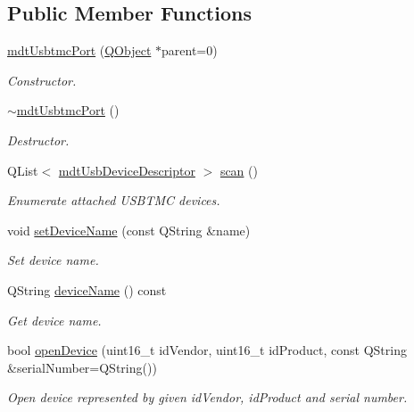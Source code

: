 \subsection*{Public Member Functions}
\begin{DoxyCompactItemize}
\item 
\hyperlink{classmdt_usbtmc_port_a102a2d5ebad4968621812e682d9d1b71}{mdt\-Usbtmc\-Port} (\hyperlink{class_q_object}{Q\-Object} $\ast$parent=0)
\begin{DoxyCompactList}\small\item\em Constructor. \end{DoxyCompactList}\item 
\hyperlink{classmdt_usbtmc_port_a3f9d3f1f40f61e17fa2997f3ad181d30}{$\sim$mdt\-Usbtmc\-Port} ()
\begin{DoxyCompactList}\small\item\em Destructor. \end{DoxyCompactList}\item 
Q\-List$<$ \hyperlink{classmdt_usb_device_descriptor}{mdt\-Usb\-Device\-Descriptor} $>$ \hyperlink{classmdt_usbtmc_port_a8f555cd150a82b74322e2f109bb094f4}{scan} ()
\begin{DoxyCompactList}\small\item\em Enumerate attached U\-S\-B\-T\-M\-C devices. \end{DoxyCompactList}\item 
void \hyperlink{classmdt_usbtmc_port_ab01ac087b91a45bfaa252c9acf882106}{set\-Device\-Name} (const Q\-String \&name)
\begin{DoxyCompactList}\small\item\em Set device name. \end{DoxyCompactList}\item 
Q\-String \hyperlink{classmdt_usbtmc_port_a998ebe6f4dced400afcdbff1c4b83b77}{device\-Name} () const 
\begin{DoxyCompactList}\small\item\em Get device name. \end{DoxyCompactList}\item 
bool \hyperlink{classmdt_usbtmc_port_a0732cfb4ba24feef01dea7c3e2e86ca3}{open\-Device} (uint16\-\_\-t id\-Vendor, uint16\-\_\-t id\-Product, const Q\-String \&serial\-Number=Q\-String())
\begin{DoxyCompactList}\small\item\em Open device represented by given id\-Vendor, id\-Product and serial number. \end{DoxyCompactList}\item 

\end{DoxyCompactItemize}
